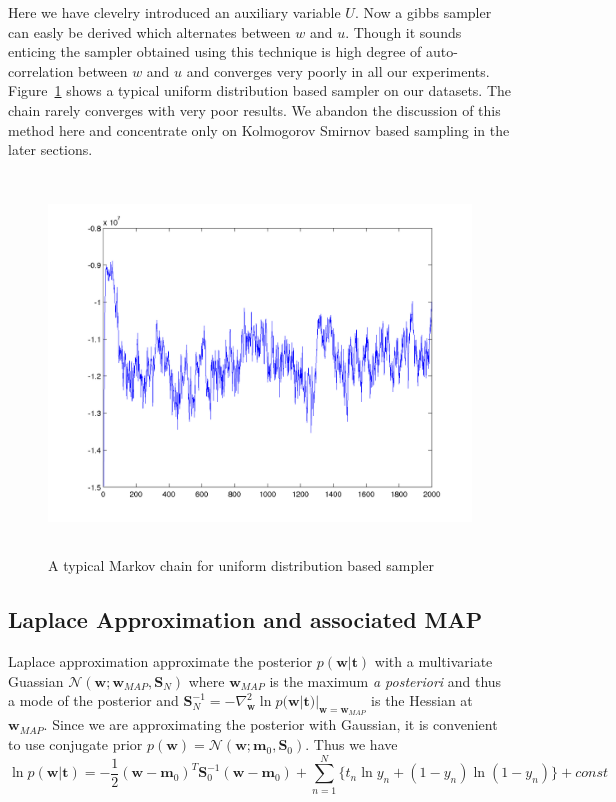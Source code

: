 Here we have clevelry introduced an auxiliary variable $U$.
Now a gibbs sampler can easly be derived which alternates between $w$ and $u$.
Though it sounds enticing the sampler obtained using this technique is high
degree of auto-correlation between $w$ and $u$ and converges very poorly in all
our experiments. Figure~\ref{fig:uniformSamplerChain} shows a typical uniform
distribution based sampler on our datasets. The chain rarely converges with very
poor results. We abandon the discussion of this method here and
concentrate only on Kolmogorov Smirnov based sampling in the later sections.

\begin{figure}[t]
\label{fig:laplace}
\centering
\includegraphics[height=10.0cm]{results/uniformSampleChain.png}

\caption{A typical Markov chain for uniform distribution based sampler }

\label{fig:uniformSamplerChain}
\end{figure}


\subsection{Laplace Approximation and associated MAP}

Laplace approximation approximate the posterior $p(\bm{w}|\bm{t})$ with a
multivariate Guassian $\mathcal{N}(\bm{w}; \bm{w}_{MAP}, \bm{S}_N)$ where
$\bm{w}_{MAP}$ is the maximum {\it a posteriori} and thus a mode of the
posterior and $\bm{S}_N^{-1} = -\nabla^2_{\bm{w}} \ln
p(\bm{w}|\bm{t})|_{\bm{w} = \bm{w}_{MAP}}$ is the Hessian at $\bm{w}_{MAP}$.
Since we are approximating the posterior with Gaussian, it is convenient to
use conjugate prior $p(\bm{w}) = \mathcal{N}(\bm{w};\bm{m}_0,\bm{S}_0)$. Thus
we have
\begin{equation}
\ln p(\bm{w}|\bm{t}) = -\frac{1}{2}(\bm{w}-\bm{m}_0)^T
\bm{S}_0^{-1}(\bm{w}-\bm{m}_0) + \sum_{n=1}^N\{t_n \ln y_n +(1-y_n) \ln
(1-y_n)\} + const
\end{equation}

